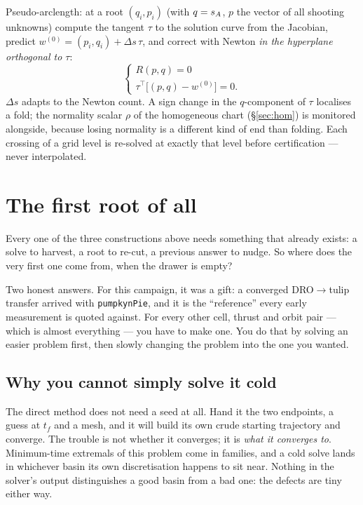 \documentclass[11pt]{article}
\newcommand{\tf}{t_f}\newcommand{\R}{\mathbb{R}}
\newcommand{\file}[1]{\texttt{#1}}
\begin{document}
\begin{rig}
Pseudo-arclength: at a root $(q_i, p_i)$ (with $q=s_A$, $p$ the vector of all
shooting unknowns) compute the tangent $\tau$ to the solution curve from the
Jacobian, predict $w^{(0)} = (p_i,q_i) + \Delta s\,\tau$, and correct with
Newton \emph{in the hyperplane orthogonal to $\tau$}:
\[
\begin{cases} R(p,q) = 0 \\[2pt] \tau^{\!\top}\big[(p,q)-w^{(0)}\big] = 0.\end{cases}
\]
$\Delta s$ adapts to the Newton count. A sign change in the $q$-component of
$\tau$ localises a fold; the normality scalar $\rho$ of the homogeneous chart
(\S\ref{sec:hom}) is monitored alongside, because losing normality is a
different kind of end than folding. Each crossing of a grid level is
re-solved at exactly that level before certification --- never interpolated.
\end{rig}

\section{The first root of all}\label{sec:first}

\begin{eli}
Every one of the three constructions above needs something that already
exists: a solve to harvest, a root to re-cut, a previous answer to nudge. So
where does the very first one come from, when the drawer is empty?

Two honest answers. For this campaign, it was a gift: a converged
DRO$\to$tulip transfer arrived with \file{pumpkynPie}, and it is the
``reference'' every early measurement is quoted against. For every other
cell, thrust and orbit pair --- which is almost everything --- you have to
make one. You do that by solving an easier problem first, then slowly
changing the problem into the one you wanted.
\end{eli}

\subsection{Why you cannot simply solve it cold}

\begin{intu}
The direct method does not need a seed at all. Hand it the two endpoints, a
guess at $\tf$ and a mesh, and it will build its own crude starting
trajectory and converge. The trouble is not whether it converges; it is
\emph{what it converges to}. Minimum-time extremals of this problem come in
families, and a cold solve lands in whichever basin its own discretisation
happens to sit near. Nothing in the solver's output distinguishes a good
basin from a bad one: the defects are tiny either way.
\end{intu}
\end{document}
